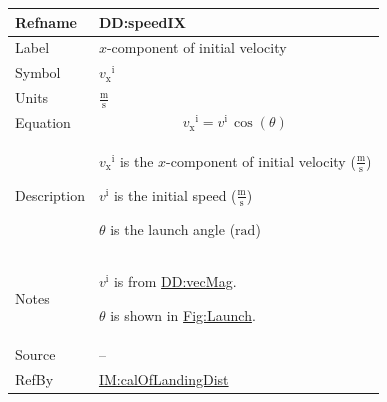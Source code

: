 \documentclass[12pt]{article}
\begin{document}
\medskip
\noindent
\begin{minipage}{\textwidth}
\begin{tabular}{>{\raggedright}p{}>{\raggedright\arraybackslash}p{}}
\toprule \textbf{Refname} & \textbf{DD:speedIX}
\label{DD:speedIX}
\\ \midrule
Label & $x$-component of initial velocity
        
\\ \midrule
Symbol & ${{v_{\text{x}}}^{\text{i}}}$
         
\\ \midrule
Units & $\frac{\text{m}}{\text{s}}$
        
\\ \midrule
Equation & \begin{displaymath}
           {{v_{\text{x}}}^{\text{i}}}={v^{\text{i}}}\,\cos\left(θ\right)
           \end{displaymath}
\\ \midrule
Description & \begin{symbDescription}
              \item{${{v_{\text{x}}}^{\text{i}}}$ is the $x$-component of initial velocity ($\frac{\text{m}}{\text{s}}$)}
              \item{${v^{\text{i}}}$ is the initial speed ($\frac{\text{m}}{\text{s}}$)}
              \item{$θ$ is the launch angle (${\text{rad}}$)}
              \end{symbDescription}
\\ \midrule
Notes & ${v^{\text{i}}}$ is from \hyperref[DD:vecMag]{DD:vecMag}.
        
        $θ$ is shown in \hyperref[Figure:Launch]{Fig:Launch}.
        
\\ \midrule
Source & --
         
\\ \midrule
RefBy & \hyperref[IM:calOfLandingDist]{IM:calOfLandingDist}
        
\\ \bottomrule
\end{tabular}
\end{minipage}
\end{document}
